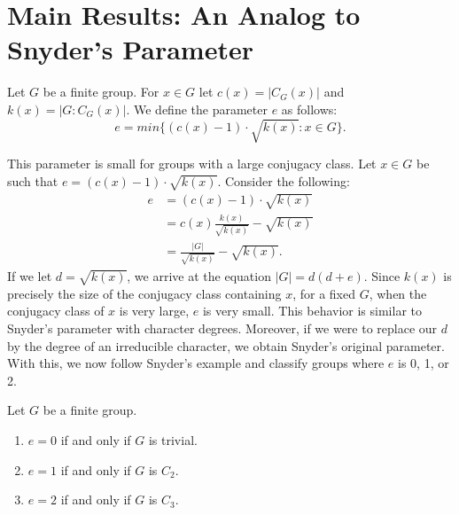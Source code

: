 \documentclass[main.tex]{subfiles}
\begin{document}
\section{Main Results: An Analog to Snyder's Parameter}

\hss

\begin{definition}
Let $G$ be a finite group. For $x \in G$ let $c(x) = |C_G(x)|$ and $k(x) = |G : C_G(x)|$. We define the parameter $e$ as follows:
$$e = min\{(c(x) - 1) \cdot \sqrt{k(x)} : x \in G\}\text{.}$$
\end{definition}

\hss

This parameter is small for groups with a large conjugacy class. Let $x \in G$ be such that $e = (c(x) - 1) \cdot \sqrt{k(x)}$. Consider the following:
\begin{align*}
e &= (c(x) - 1) \cdot \sqrt{k(x)} \\
 &= c(x)\frac{k(x)}{\sqrt{k(x)}} - \sqrt{k(x)} \\
 &= \frac{|G|}{\sqrt{k(x)}} - \sqrt{k(x)}\text{.}
\end{align*}
If we let $d = \sqrt{k(x)}$, we arrive at the equation $|G| = d (d + e)$. Since $k(x)$ is precisely the size of the conjugacy class containing $x$, for a fixed $G$, when the conjugacy class of $x$ is very large, $e$ is very small. This behavior is similar to Snyder's parameter with character degrees. Moreover, if we were to replace our $d$ by the degree of an irreducible character, we obtain Snyder's original parameter. With this, we now follow Snyder's example and classify groups where $e$ is 0, 1, or 2.

\begin{theorem}\label{easycharacterization}
Let $G$ be a finite group.
\begin{enumerate}
	\item $e = 0$ if and only if $G$ is trivial.
	\item $e = 1$ if and only if $G$ is $C_2$.
	\item $e = 2$ if and only if $G$ is $C_3$.
\end{enumerate}
\end{theorem}
\end{document}
